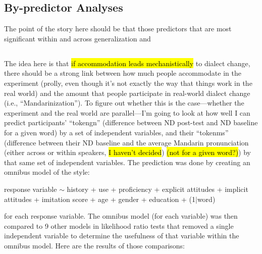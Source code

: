 \subsection{By-predictor Analyses}
The point of the story here should be that those predictors that are most significant within and across generalization and 
\subsection{}
The idea here is that \hl{if accommodation leads mechanistically} to dialect change, there should be a strong link between how much people accommodate in the experiment (prolly, even though it's not exactly the way that things work in the real world) and the amount that people participate in real-world dialect change (i.e., ``Mandarinization''). To figure out whether this is the case---whether the experiment and the real world are parallel---I'm going to look at how well I can predict participants' ``tokengn'' (difference between ND post-test and ND baseline for a given word) by a set of independent variables, and their ``tokenms'' (difference between their ND baseline and the average Mandarin pronunciation (either across or within speakers, \hl{I haven't decided}) \hl{(not for a given word?)}) by that same set of independent variables. The prediction was done by creating an omnibus model of the style:

response variable $\sim$ history + use + proficiency + explicit attitudes + implicit attitudes + imitation score + age + gender + education + (1$|$word)

for each response variable. The omnibus model (for each variable) was then compared to 9 other models in likelihood ratio tests that removed a single independent variable to determine the usefulness of that variable within the omnibus model. Here are the results of those comparisons:

